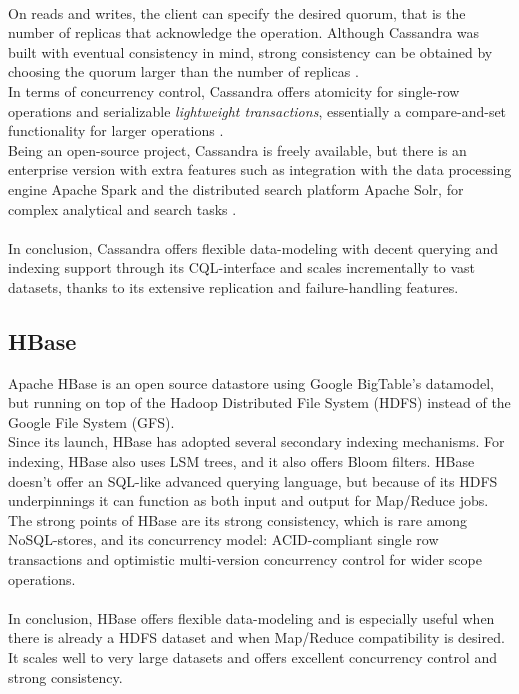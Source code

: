 \documentclass{IEEEtran}
\begin{document}
\\On reads and writes, the client can specify the desired quorum, that is the number of replicas that acknowledge the operation. Although Cassandra was built with eventual consistency in mind, strong consistency can be obtained by choosing the quorum larger than the number of replicas \cite{grolinger2013data}.\\
In terms of concurrency control, Cassandra offers atomicity for single-row operations and serializable \textit{lightweight transactions}, essentially a compare-and-set functionality for larger operations \cite{cassandra_lightweight_trans}.\\
Being an open-source project, Cassandra is freely available, but there is an enterprise version with extra features such as integration with the data processing engine Apache Spark and the distributed search platform Apache Solr, for complex analytical and search tasks \cite{cassandra_solr} \cite{cassandra_spark} \cite{zaharia2010spark}\cite{apache_solr}.\\\\
In conclusion, Cassandra offers flexible data-modeling with decent querying and indexing support through its CQL-interface and scales incrementally to vast datasets, thanks to its extensive replication and failure-handling features.

\subsection{HBase}

Apache HBase is an open source datastore using Google BigTable's datamodel, but running on top of the Hadoop Distributed File System (HDFS) instead of the Google File System (GFS).
\\Since its launch, HBase has adopted several secondary indexing mechanisms. For indexing, HBase also uses LSM trees\cite{borthakur2011apache}\cite{sears2012blsm}, and it also offers Bloom filters\cite{hbase_schema}. HBase doesn't offer an SQL-like advanced querying language, but because of its HDFS underpinnings it can function as both input and output for Map/Reduce jobs.
\\The strong points of HBase are its strong consistency, which is rare among NoSQL-stores, and its concurrency model: ACID-compliant single row transactions and optimistic multi-version concurrency control for wider scope operations\cite{hbase_acid}\cite{grolinger2013data}\cite{borthakur2011apache}.\\\\
In conclusion, HBase offers flexible data-modeling and is especially useful when there is already a HDFS dataset and when Map/Reduce compatibility is desired. It scales well to very large datasets and offers excellent concurrency control and strong consistency.
\end{document}
